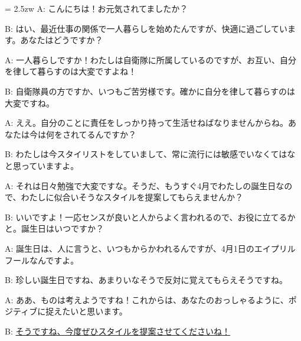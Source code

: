 \documentclass[11pt]{amsart}
\title{}
\author{}
\newenvironment{hangall}[1]{\hangindent = 2.5zw\everypar{\hangindent = 2.5zw}}{}
\begin{document}
\maketitle
\begin{hangall}{}%
A: こんにちは！お元気されてましたか？

B: はい、最近仕事の関係で一人暮らしを始めたんですが、快適に過ごしています。あなたはどうですか？

A: 一人暮らしですか！わたしは自衛隊に所属しているのですが、お互い、自分を律して暮らすのは大変ですよね！

B: 自衛隊員の方ですか、いつもご苦労様です。確かに自分を律して暮らすのは大変ですね。

A: ええ。自分のことに責任をしっかり持って生活せねばなりませんからね。あなたは今は何をされてるんですか？

B: わたしは今スタイリストをしていまして、常に流行には敏感でいなくてはなと思っていますよ。

A: それは日々勉強で大変ですな。そうだ、もうすぐ4月でわたしの誕生日なので、わたしに似合いそうなスタイルを提案してもらえませんか？

B: いいですよ！一応センスが良いと人からよく言われるので、お役に立てるかと。誕生日はいつですか？

A: 誕生日は、人に言うと、いつもからかわれるんですが、4月1日のエイプリルフールなんですよ。

B: 珍しい誕生日ですね、あまりいなそうで反対に覚えてもらえそうですね。

A: ああ、ものは考えようですね！これからは、あなたのおっしゃるように、ポジティブに捉えたいと思います。

B: \ul{そうですね、今度ぜひスタイルを提案させてくださいね！}\end{hangall}
\end{document}
